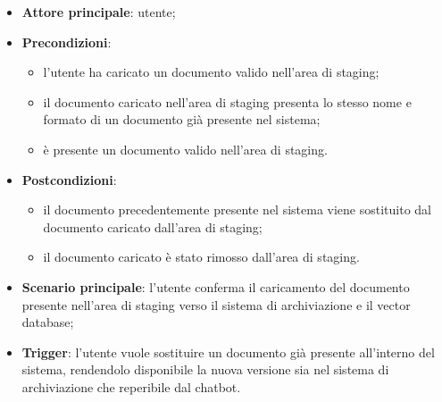 \documentclass[10pt, a4paper]{article}
\begin{document}
    \begin{itemize}
        \item \textbf{Attore principale}: utente;
        \item \textbf{Precondizioni}:
            \begin{itemize}
                \item l’utente ha caricato un documento valido nell’area di staging;
                \item il documento caricato nell'area di staging presenta lo stesso nome e formato di un documento già presente nel sistema;
                \item è presente un documento valido nell’area di staging.
            \end{itemize}
        \item \textbf{Postcondizioni}:
            \begin{itemize}
                \item il documento precedentemente presente nel sistema viene sostituito dal documento caricato dall'area di staging;
                \item il documento caricato è stato rimosso dall’area di staging.
            \end{itemize}
        \item \textbf{Scenario principale}: l’utente conferma il caricamento del documento presente nell'area di staging verso il sistema di archiviazione e il vector database;
        \item \textbf{Trigger}: l’utente vuole sostituire un documento già presente all'interno del sistema, rendendolo disponibile la nuova versione sia nel sistema di archiviazione che reperibile dal chatbot.
    \end{itemize}
\end{document}
